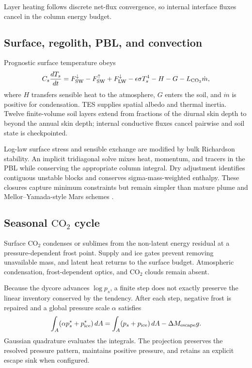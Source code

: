 \documentclass{article}
\begin{document}
Layer heating follows discrete net-flux convergence, so internal interface
fluxes cancel in the column energy budget.

\subsection{Surface, regolith, PBL, and convection}
Prognostic surface temperature obeys
\begin{equation}
C_s\frac{dT_s}{dt}=F^\downarrow_{\rm SW}-F^\uparrow_{\rm SW}
+F^\downarrow_{\rm LW}-\epsilon\sigma T_s^4-H-G-L_{\rm CO_2}\dot m,
\end{equation}
where \(H\) transfers sensible heat to the atmosphere, \(G\) enters the soil,
and \(\dot m\) is positive for condensation. TES supplies spatial albedo and
thermal inertia. Twelve finite-volume soil layers extend from fractions of the
diurnal skin depth to beyond the annual skin depth; internal conductive fluxes
cancel pairwise and soil state is checkpointed.

Log-law surface stress and sensible exchange are modified by bulk Richardson
stability. An implicit tridiagonal solve mixes heat, momentum, and tracers in the
PBL while conserving the appropriate column integral. Dry adjustment identifies
contiguous unstable blocks and conserves sigma-mass-weighted enthalpy. These
closures capture minimum constraints but remain simpler than mature plume and
Mellor--Yamada-style Mars schemes
\citep{forget1999improved,haberle2019ames,colaitis2013pbl}.

\subsection{Seasonal \texorpdfstring{\(\mathrm{CO_2}\)}{CO2} cycle}
Surface \(\mathrm{CO_2}\) condenses or sublimes from the non-latent energy
residual at a pressure-dependent frost point. Supply and ice gates prevent
removing unavailable mass, and latent heat returns to the surface budget.
Atmospheric condensation, frost-dependent optics, and \(\mathrm{CO_2}\) clouds
remain absent.

Because the dycore advances \(\log p_s\), a finite step does not exactly preserve
the linear inventory conserved by the tendency. After each step, negative frost
is repaired and a global pressure scale \(\alpha\) satisfies
\begin{equation}
\int_A(\alpha p_s^*+p_{\rm ice}^*)\,dA
=\int_A(p_s+p_{\rm ice})\,dA-\Delta M_{\rm escape}g.
\end{equation}
Gaussian quadrature evaluates the integrals. The projection preserves the
resolved pressure pattern, maintains positive pressure, and retains an explicit
escape sink when configured.
\end{document}
